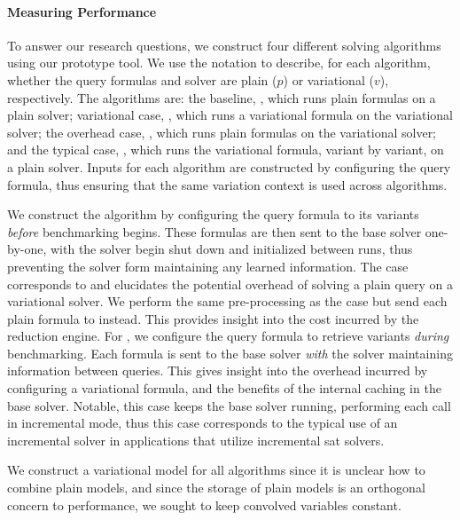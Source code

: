\paragraph{Measuring Performance}%
\label{sec:exper:perf}
%
To answer our research questions, we construct four different solving
algorithms using our prototype tool. We use the notation
 to describe, for each algorithm, whether the query
formulas and solver are plain ($p$) or variational ($v$), respectively.
%
The algorithms are: the baseline, \pTop{}, which runs plain formulas on a plain
solver; variational case, \vTov{}, which runs a variational formula on the
variational solver; the overhead case, \pTov{}, which runs plain formulas on the
variational solver; and the typical case, \vTop{}, which runs the variational
formula, variant by variant, on a plain solver. Inputs for each algorithm are
constructed by configuring the query formula, thus ensuring that the same
variation context is used across algorithms.

We construct the \pTop{} algorithm by configuring the query formula to its
variants \textit{before} benchmarking begins. These formulas are then sent to
the base solver one-by-one, with the solver begin shut down and initialized
between runs, thus preventing the solver form maintaining any learned
information.
%
The \pTov{} case corresponds to  and elucidates the potential overhead
of solving a plain query on a variational solver. We perform the same
pre-processing as the \pTop{} case but send each plain formula to \vsat{}
instead. This provides insight into the cost incurred by the reduction engine.
%
For \vTop{}, we configure the query formula to retrieve variants \textit{during}
benchmarking. Each formula is sent to the base solver \textit{with} the solver
maintaining information between queries. This gives insight into the overhead
incurred by configuring a variational formula, and the benefits of the internal
caching in the base solver. Notable, this case keeps the base solver running,
performing each call in incremental mode, thus this case corresponds to the
typical use of an incremental solver in applications that utilize incremental
\ac{sat} solvers.

We construct a variational model for all algorithms since it is unclear how to
combine plain models, and since the storage of plain models is an orthogonal
concern to performance, we sought to keep convolved variables constant.


